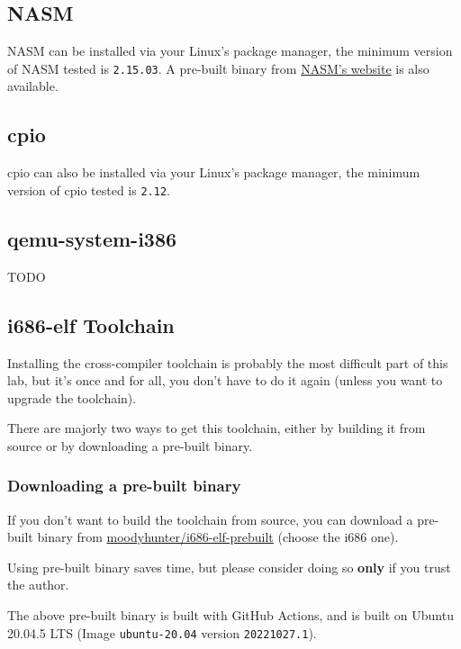 \subsection{NASM} \label{sec:nasm-install}

NASM can be installed via your Linux's package manager, the minimum version of NASM tested is
\texttt{2.15.03}. A pre-built binary from \href{https://www.nasm.us}{NASM's website} is also
available.

\subsection{cpio} \label{sec:cpio-install}

cpio can also be installed via your Linux's package manager, the minimum version of cpio
tested is \texttt{2.12}.

\subsection{qemu-system-i386} \label{sec:qemu-install}

TODO

\subsection{i686-elf Toolchain} \label{sec:cross-compiler-install}

Installing the cross-compiler toolchain is probably the most difficult part of this lab,
but it's once and for all, you don't have to do it again (unless you want to upgrade the
toolchain).

There are majorly two ways to get this toolchain, either by building it from source or by
downloading a pre-built binary.

\subsubsection{Downloading a pre-built binary}

If you don't want to build the toolchain from source, you can download a pre-built
binary from
\href{https://github.com/moodyhunter/i686-elf-prebuilt/releases}{moodyhunter/i686-elf-prebuilt}
(choose the i686 one).

\begin{warning}
    \item Using pre-built binary saves time, but please consider doing so \textbf{only} if
    you trust the author.
    \item The above pre-built binary is built with GitHub Actions, and is built on Ubuntu 20.04.5
    LTS (Image \texttt{ubuntu-20.04} version \texttt{20221027.1}).
\end{warning}

